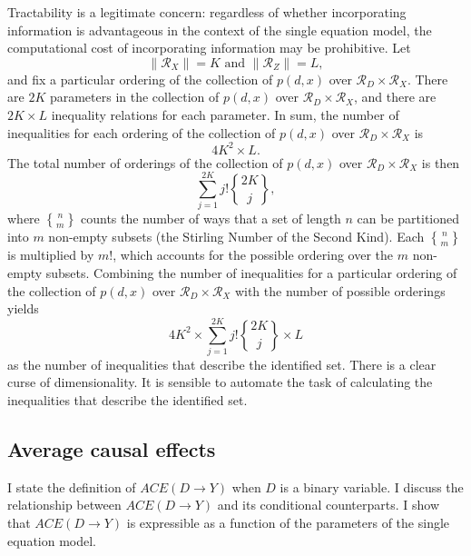 \documentclass[12pt,a4paper,twoside]{article}
\DeclareRobustCommand{\stirling}{\genfrac\{\}{0pt}{}}
\numberwithin{equation}{section}
\begin{document}
Tractability is a legitimate concern: regardless of whether incorporating information is advantageous in the context of the single equation model, the computational cost of incorporating information may be prohibitive. Let
\[\|\mathcal{R}_X\|=K\text{ and }\|\mathcal{R}_Z\|=L,\]
and fix a particular ordering of the collection of $p(d,x)$ over $\mathcal{R}_D\times\mathcal{R}_X$. There are $2K$ parameters in the collection  of $p(d,x)$ over $\mathcal{R}_D\times\mathcal{R}_X$, and there are $2K\times L$ inequality relations for each parameter. In sum, the number of inequalities for each ordering of the collection of $p(d,x)$ over $\mathcal{R}_D\times\mathcal{R}_X$ is
\[4K^2\times L.\]
The total number of orderings of the collection of $p(d,x)$ over $\mathcal{R}_D\times\mathcal{R}_X$ is then
\[\sum_{j=1}^{2K}j!\stirling{2K}{j},\]
where $\stirling{n}{m}$ counts the number of ways that a set of length $n$ can be partitioned into $m$ non-empty subsets (the Stirling Number of the Second Kind). Each $\stirling{n}{m}$ is multiplied by $m!$, which accounts for the possible ordering over the $m$ non-empty subsets. Combining the number of inequalities for a particular ordering of the collection of $p(d,x)$ over $\mathcal{R}_D\times\mathcal{R}_X$ with the number of possible orderings yields
\[4K^2\times\sum_{j=1}^{2K}j!\stirling{2K}{j}\times L\]
as the number of inequalities that describe the identified set. There is a clear curse of dimensionality. It is sensible to automate the task of calculating the inequalities that describe the identified set.
\subsection{Average causal effects}
I state the definition of $ACE(D\rightarrow Y)$ when $D$ is a binary variable. I discuss the relationship between $ACE(D\rightarrow Y)$ and its conditional counterparts. I show that $ACE(D\rightarrow Y)$ is expressible as a function of the parameters of the single equation model. 
\end{document}
